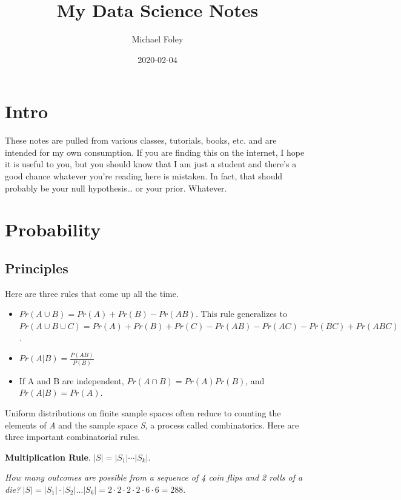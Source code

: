 \documentclass[]{book}
\title{My Data Science Notes}
\author{Michael Foley}
\date{2020-02-04}
\begin{document}
\maketitle

{
\setcounter{tocdepth}{1}
\tableofcontents
}
\hypertarget{intro}{%
\chapter*{Intro}\label{intro}}

These notes are pulled from various classes, tutorials, books, etc. and are intended for my own consumption. If you are finding this on the internet, I hope it is useful to you, but you should know that I am just a student and there's a good chance whatever you're reading here is mistaken. In fact, that should probably be your null hypothesis\ldots{} or your prior. Whatever.

\hypertarget{probability}{%
\chapter{Probability}\label{probability}}

\hypertarget{principles}{%
\section{Principles}\label{principles}}

Here are three rules that come up all the time.

\begin{itemize}
\item
  \(Pr(A \cup B) = Pr(A)+Pr(B) - Pr(AB)\). This rule generalizes to
  \(Pr(A \cup B \cup C)=Pr(A)+Pr(B)+Pr(C)-Pr(AB)-Pr(AC)-Pr(BC)+Pr(ABC)\).
\item
  \(Pr(A|B) = \frac{P(AB)}{P(B)}\)
\item
  If A and B are independent, \(Pr(A \cap B) = Pr(A)Pr(B)\), and \(Pr(A|B)=Pr(A)\).
\end{itemize}

Uniform distributions on finite sample spaces often reduce to counting the elements of \emph{A} and the sample space \emph{S}, a process called combinatorics. Here are three important combinatorial rules.

\textbf{Multiplication Rule}. \(|S|=|S_1 |⋯|S_k|\).

\emph{How many outcomes are possible from a sequence of 4 coin flips and 2 rolls of a die?}
\(|S|=|S_1| \cdot |S_2| \dots |S_6| = 2 \cdot 2 \cdot 2 \cdot 2 \cdot 6 \cdot 6 = 288\).
\end{document}
